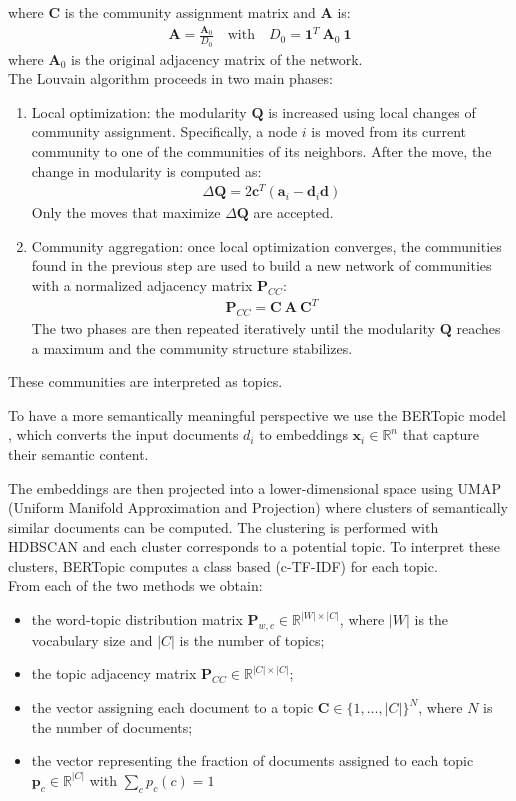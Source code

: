 \documentclass[conference]{IEEEtran}
\begin{document}
where $\mathbf{C}$ is the community assignment matrix and $\mathbf{A}$ is:
\begin{align*}
    \mathbf{A} = \frac{\mathbf{A}_0}{D_0} \quad \text{with} \quad D_0 = \mathbf{1}^T \: \mathbf{A}_0 \: \mathbf{1}
\end{align*}
where $\mathbf{A}_0$ is the original adjacency matrix of the network.\\
The Louvain algorithm proceeds in two main phases:
\begin{enumerate}
    \item Local optimization: the modularity $\mathbf{Q}$ is increased using local changes of community assignment. Specifically, a node $i$ is moved from its current community to one of the communities of its neighbors. After the move, the change in modularity is computed as:
    \begin{align*}
        \Delta \mathbf{Q} = 2 \mathbf{c}^T (\mathbf{a}_i - \mathbf{d}_i \mathbf{d})
    \end{align*}
    Only the moves that maximize $\Delta \mathbf{Q}$ are accepted.
    \item Community aggregation: once local optimization converges, the communities found in the previous step are used to build a new network of communities with a normalized adjacency matrix $\mathbf{P}_{CC}$:
    \begin{align*}
        \mathbf{P}_{CC} = \mathbf{C} \: \mathbf{A} \: \mathbf{C}^T
    \end{align*}
    The two phases are then repeated iteratively until the modularity $\mathbf{Q}$ reaches a maximum and the community structure stabilizes.
\end{enumerate}
These communities are interpreted as topics.

To have a more semantically meaningful perspective we use the BERTopic model \cite{b20}, which converts the input documents $d_i$ to embeddings $\mathbf{x}_i \in \mathbb{R}^n$ that capture their semantic content.

The embeddings are then projected into a lower-dimensional space using UMAP (Uniform Manifold Approximation and Projection) \cite{b21} where clusters of semantically similar documents can be computed. The clustering is performed with HDBSCAN \cite{b22} and each cluster corresponds to a potential topic. To interpret these clusters, BERTopic computes a class based (c-TF-IDF) for each topic.\\
From each of the two methods we obtain:
\begin{itemize}
    \item the word-topic distribution matrix $\mathbf{P}_{w,c} \in \mathbb{R}^{|W|\times|C|}$, where $|W|$ is the vocabulary size and $|C|$ is the number of topics;
    \item the topic adjacency matrix $\mathbf{P}_{CC} \in \mathbb{R}^{|C|\times|C|}$;
    \item the vector assigning each document to a topic $\mathbf{C} \in \{1,\dots,|C|\}^N$, where $N$ is the number of documents;
    \item the vector representing the fraction of documents assigned to each topic $\mathbf{p}_c \in \mathbb{R}^{|C|}$ with $\sum_c p_c(c)=1$
\end{itemize}
\end{document}
